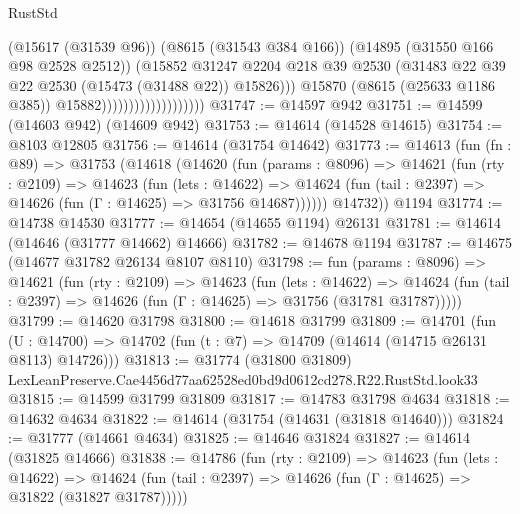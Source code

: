 \begin{lexlean}{RustStd}
\begin{coremodule}
                                            (@15617 (@31539 @96))
                                            (@8615 (@31543 @384 @166))
                                            (@14895 (@31550 @166 @98 @2528 @2512))
                                            (@15852
                                              @31247
                                              @2204
                                              @218
                                              @39
                                              @2530
                                              (@31483
                                                @22
                                                @39
                                                @22
                                                @2530
                                                (@15473 (@31488 @22))
                                                @15826)))
                                          @15870
                                          (@8615 (@25633 @1186 @385))
                                          @15882)))))))))))))))))))
@31747 := @14597 @942
@31751 := @14599 (@14603 @942) (@14609 @942)
@31753 := @14614 (@14528 @14615)
@31754 := @8103 @12805
@31756 := @14614 (@31754 @14642)
@31773 := @14613
    (fun (fn : @89) =>
    @31753
      (@14618
        (@14620
          (fun (params : @8096) =>
          @14621
            (fun (rty : @2109) =>
            @14623
              (fun (lets : @14622) =>
              @14624 (fun (tail : @2397) => @14626 (fun (Γ : @14625) => @31756 @14687))))))
        @14732))
    @1194
@31774 := @14738 @14530
@31777 := @14654 (@14655 @1194) @26131
@31781 := @14614 (@14646 (@31777 @14662) @14666)
@31782 := @14678 @1194
@31787 := @14675 (@14677 @31782 @26134 @8107 @8110)
@31798 := fun (params : @8096) =>
  @14621
    (fun (rty : @2109) =>
    @14623
      (fun (lets : @14622) =>
      @14624 (fun (tail : @2397) => @14626 (fun (Γ : @14625) => @31756 (@31781 @31787)))))
@31799 := @14620 @31798
@31800 := @14618 @31799
@31809 := @14701
    (fun (U : @14700) => @14702 (fun (t : @7) => @14709 (@14614 (@14715 @26131 @8113) @14726)))
@31813 := @31774
    (@31800 @31809)
    LexLeanPreserve.Cae4456d77aa62528ed0bd9d0612cd278.R22.RustStd.look33
@31815 := @14599 @31799 @31809
@31817 := @14783 @31798 @4634
@31818 := @14632 @4634
@31822 := @14614 (@31754 (@14631 (@31818 @14640)))
@31824 := @31777 (@14661 @4634)
@31825 := @14646 @31824
@31827 := @14614 (@31825 @14666)
@31838 := @14786
    (fun (rty : @2109) =>
    @14623
      (fun (lets : @14622) =>
      @14624 (fun (tail : @2397) => @14626 (fun (Γ : @14625) => @31822 (@31827 @31787)))))

\end{coremodule}
\end{lexlean}
